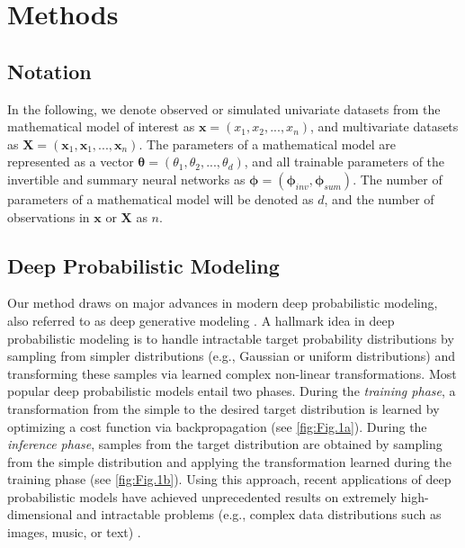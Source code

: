 \documentclass[9pt,twoside,lineno]{pnas-new}
\begin{document}
\section*{Methods}

\subsection*{Notation}

In the following, we denote observed or simulated univariate datasets from the mathematical model of interest as $\boldsymbol{x} = (x_{1}, x_{2},...,x_{n})$, and multivariate datasets as $\boldsymbol{X} = (\boldsymbol{x}_{1}, \boldsymbol{x}_{1},...,\boldsymbol{x}_{n})$. The parameters of a mathematical model are represented as a vector $\boldsymbol{\theta} = (\theta_{1}, \theta_{2},...,\theta_{d})$, and all trainable parameters of the invertible and summary neural networks as $\boldsymbol{\phi} = (\boldsymbol{\phi}_{inv}, \boldsymbol{\phi}_{sum})$. The number of parameters of a mathematical model will be denoted as $d$, and the number of observations in $\boldsymbol{x}$ or $\boldsymbol{X}$ as $n$.

\subsection*{Deep Probabilistic Modeling}

Our method draws on major advances in modern deep probabilistic modeling, also referred to as deep generative modeling \cite{bloem2019probabilistic, kingma2018glow, ardizzone2018analyzing, kingma2014auto}. A hallmark idea in deep probabilistic modeling is to handle intractable target probability distributions by sampling from simpler distributions (e.g., Gaussian or uniform distributions) and transforming these samples via learned complex non-linear transformations. Most popular deep probabilistic models entail two phases. During the \textit{training phase}, a transformation from the simple to the desired target distribution is learned by optimizing a cost function via backpropagation (see \autoref{fig:Fig.1a}). During the \textit{inference phase}, samples from the target distribution are obtained by sampling from the simple distribution and applying the transformation learned during the training phase (see \autoref{fig:Fig.1b}). Using this approach, recent applications of deep probabilistic models have achieved unprecedented results on extremely high-dimensional and intractable problems (e.g., complex data distributions such as images, music, or text)  \cite{bloem2019probabilistic, kingma2018glow, grover2018flow}.
\end{document}
